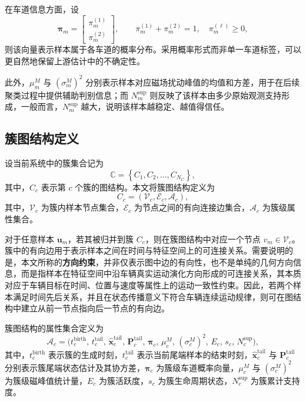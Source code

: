 \documentclass{xdupgthesis}
\begin{document}
在车道信息方面，设
\begin{equation}
	\boldsymbol{\pi}_m=
	\begin{bmatrix}
		\pi_m^{(1)}\\[2pt]
		\pi_m^{(2)}
	\end{bmatrix},
	\qquad
	\pi_m^{(1)}+\pi_m^{(2)}=1,\quad
	\pi_m^{(\ell)}\ge 0,
\end{equation}
则该向量表示样本属于各车道的概率分布。采用概率形式而非单一车道标签，可以更自然地保留上游估计中的不确定性。

此外，$\mu_m^{M}$ 与 $(\sigma_m^{M})^{2}$ 分别表示样本对应磁场扰动峰值的均值和方差，用于在后续聚类过程中提供辅助判别信息；而 $N_m^{\mathrm{sup}}$ 则反映了该样本由多少原始观测支持形成，一般而言，$N_m^{\mathrm{sup}}$ 越大，说明该样本越稳定、越值得信任。

\subsection{簇图结构定义}

设当前系统中的簇集合记为
\begin{equation}
	\mathbb{C}=\left\{C_1,C_2,\ldots,C_{N_C}\right\},
\end{equation}
其中，$C_c$ 表示第 $c$ 个簇的图结构。本文将簇图结构定义为
\begin{equation}
	C_c = \left(\mathcal{V}_c,\mathcal{E}_c,\mathcal{A}_c\right),
\end{equation}
其中，$\mathcal{V}_c$ 为簇内样本节点集合，$\mathcal{E}_c$ 为节点之间的有向连接边集合，$\mathcal{A}_c$ 为簇级属性集合。

对于任意样本 $\mathbf{u}_m$，若其被归并到簇 $C_c$，则在簇图结构中对应一个节点 $v_m\in\mathcal{V}_c$。簇中的有向边用于表示样本之间在时间与特征空间上的可连接关系。需要说明的是，本文所称的\textbf{方向约束}，并非仅表示图中边的有向性，也不是单纯的几何方向信息，而是指样本在特征空间中沿车辆真实运动演化方向形成的可连接关系，其本质对应于车辆目标在时间、位置与速度等属性上的运动一致性约束。因此，若两个样本满足时间先后关系，并且在状态传播意义下符合车辆连续运动规律，则可在图结构中建立从前一节点指向后一节点的有向边。

簇图结构的属性集合定义为
\begin{equation}
	\mathcal{A}_c=
	\Big(
	t_c^{\mathrm{birth}},\,
	t_c^{\mathrm{tail}},\,
	\hat{\mathbf{x}}_c^{\mathrm{tail}},\,
	\mathbf{P}_c^{\mathrm{tail}},\,
	\boldsymbol{\pi}_c,\,
	\mu_c^{M},\,
	(\sigma_c^{M})^{2},\,
	E_c,\,
	s_c,\,
	N_c^{\mathrm{sup}}
	\Big),
\end{equation}
其中，$t_c^{\mathrm{birth}}$ 表示簇的生成时刻，$t_c^{\mathrm{tail}}$ 表示当前尾端样本的结束时刻，$\hat{\mathbf{x}}_c^{\mathrm{tail}}$ 与 $\mathbf{P}_c^{\mathrm{tail}}$ 分别表示簇尾端状态估计及其协方差，$\boldsymbol{\pi}_c$ 为簇级车道概率向量，$\mu_c^{M}$ 与 $(\sigma_c^{M})^{2}$ 为簇级磁峰值统计量，$E_c$ 为簇活跃度，$s_c$ 为簇生命周期状态，$N_c^{\mathrm{sup}}$ 为簇累计支持度。
\end{document}
